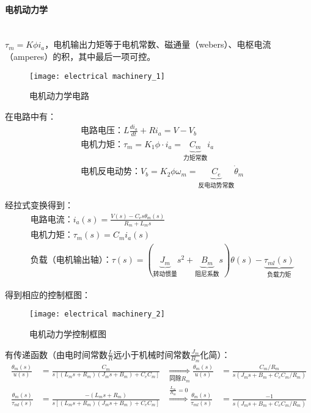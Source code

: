 \documentclass[
12pt, %
a4paper, 
oneside, %
headinclude,footinclude, %
]{scrartcl}
\begin{document}
\paragraph{电机动力学}~\\

$ \tau_m = K \phi i_a $，电机输出力矩等于电机常数、磁通量（webers）、电枢电流（amperes）的积，其中最后一项可控。

\noindent
\begin{minipage}{0.5\textwidth}
\begin{figure}[H]
\centering 
\texttt{[image: electrical machinery\_1]} 
\caption{电机动力学电路}
\end{figure}
\end{minipage}
\begin{minipage}{0.5\textwidth}
在电路中有：
\begin{align*} 
&\text{电路电压：} L\frac{di_a}{dt} + Ri_a = V - V_b \\
&\text{电机力矩：} \tau_m = K_1 \phi \cdot i_a = \underbrace{C_m}_{\text{力矩常数}} i_a \\
&\text{电机反电动势：} V_b = K_2 \phi \omega_m = \underbrace{C_e}_{\text{反电动势常数}} \dot{\theta}_m  
\end{align*}
\end{minipage}

经拉式变换得到：
\begin{align*} 
&\text{电路电流：} i_a(s) = \frac{V(s) - C_e s\theta_m(s)}{R_m + L_m s} \\
&\text{电机力矩：} \tau_m(s) = C_m i_a(s) \\
&\text{负载（电机输出轴）：} \tau(s) = (\underbrace{J_m}_{\text{转动惯量}} s^2 + \underbrace{B_m}_{\text{阻尼系数}} s)\theta(s) - \underbrace{\tau_{ml}(s)}_{\text{负载力矩}} 
\end{align*}

得到相应的控制框图：
\begin{figure}[H]
\centering 
\texttt{[image: electrical machinery\_2]} 
\caption{电机动力学控制框图}
\end{figure}

有传递函数（由电时间常数$ \frac{L}{R} $远小于机械时间常数$ \frac{J_m}{B_m} $化简）：
\begin{align*}
\frac{\theta_m(s)}{u(s)} &= \frac{C_m}{s[(L_m s + R_m)(J_m s + B_m) + C_e C_m]}& \underset{\text{同除}R_m}{\Longrightarrow} \frac{\theta_m(s)}{u(s)} &= \frac{C_m/R_m}{s(J_m s + B_m + C_e C_m/R_m)} \\
\frac{\theta_m(s)}{\tau_{ml}(s)} &= \frac{-(L_m s + R_m)}{s[(L_m s + R_m)(J_m s + B_m) + C_e C_m]}& \overset{\frac{L_m}{R_m} = 0}{\Longrightarrow} \frac{\theta_m(s)}{\tau_{ml}(s)} &= \frac{-1}{s(J_m s + B_m + C_e C_m/R_m)}
\end{align*}
\end{document}
